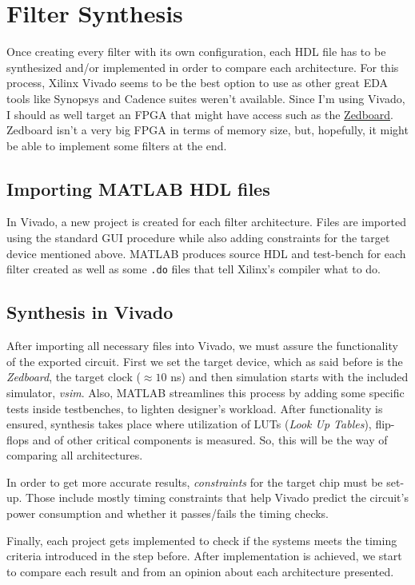 \section{Filter Synthesis}

Once creating every filter with its own configuration, each HDL file has to be synthesized and/or implemented in order to compare each architecture.
For this process, Xilinx Vivado seems to be the best option to use as other great EDA tools like Synopsys and Cadence suites weren't available. Since I'm using Vivado, I should as well target an FPGA that might have access such as the \href{https://www.xilinx.com/products/boards-and-kits/1-8dyf-11.html}{Zedboard}. Zedboard isn't a very big FPGA in terms of memory size, but, hopefully, it might be able to implement some filters at the end.

\subsection{Importing MATLAB HDL files}
In Vivado, a new project is created for each filter architecture. Files are imported using the standard GUI procedure while also adding constraints for the target device mentioned above.
MATLAB produces source HDL and test-bench for each filter created as well as some \verb|.do| files that tell Xilinx's compiler what to do.

\subsection{Synthesis in Vivado}
After importing all necessary files into Vivado, we must assure the functionality of the exported circuit.
First we set the target device, which as said before is the \textit{Zedboard}, the target clock ($\approx10$ ns) and then simulation starts with the included simulator, \emph{vsim}.
Also, MATLAB streamlines this process by adding some specific tests inside testbenches, to lighten designer's workload.
After functionality is ensured, synthesis takes place where utilization of LUTs (\textit{Look Up Tables}), flip-flops and of other critical components is measured.
So, this will be the way of comparing all architectures.

In order to get more accurate results, \emph{constraints} for the target chip must be set-up. Those include mostly timing constraints that help Vivado predict the circuit's power consumption and whether it passes/fails the timing checks.

Finally, each project gets implemented to check if the systems meets the timing criteria introduced in the step before. After implementation is achieved, we start to compare each result and from an opinion about each architecture presented.
